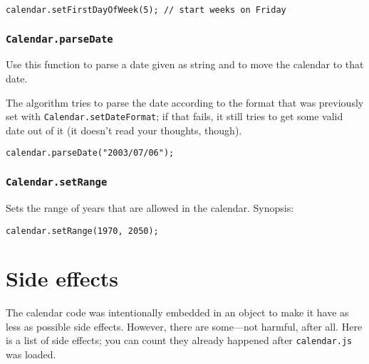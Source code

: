 \documentclass[a4paper,twoside,10pt]{dynadoc}
\begin{document}
\begin{verbatim}
calendar.setFirstDayOfWeek(5); // start weeks on Friday
\end{verbatim}

\subsubsection{\texttt{Calendar.parseDate}}\label{sec:Calendar.parseDate}

Use this function to parse a date given as string and to move the calendar to
that date.

The algorithm tries to parse the date according to the format that was
previously set with \texttt{Calendar.setDateFormat}; if that fails, it still
tries to get some valid date out of it (it doesn't read your thoughts, though).

\begin{verbatim}
calendar.parseDate("2003/07/06");
\end{verbatim}

\subsubsection{\texttt{Calendar.setRange}}\label{sec:Calendar.setRange}

Sets the range of years that are allowed in the calendar.  Synopsis:

\begin{verbatim}
calendar.setRange(1970, 2050);
\end{verbatim}







\section{Side effects}

The calendar code was intentionally embedded in an object to make it have as
less as possible side effects.  However, there are some---not harmful, after
all.  Here is a list of side effects; you can count they already happened after
\texttt{calendar.js} was loaded.
\end{document}
